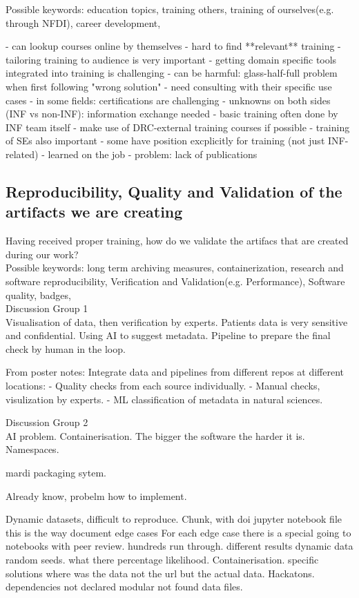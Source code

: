 \documentclass{eceasst}
\begin{document}
Possible keywords: education topics, training others, training of ourselves(e.g. through NFDI), career development,

- can lookup courses online by themselves
    - hard to find **relevant** training
    - tailoring training to audience is very important
    - getting domain specific tools integrated into training is challenging
	- can be harmful: glass-half-full problem when first following "wrong solution"
- need consulting with their specific use cases
- in some fields: certifications are challenging
    - unknowns on both sides (INF vs non-INF): information exchange needed
- basic training often done by INF team itself
- make use of DRC-external training courses if possible
- training of SEs also important
- some have position excplicitly for training (not just INF-related)
    - learned on the job
	- problem: lack of publications

\subsection{Reproducibility, Quality and Validation of the artifacts we are creating}
Having received proper training, how do we validate the artifacs that are created during our work?\\
Possible keywords: long term archiving measures, containerization, research and software reproducibility, Verification and Validation(e.g. Performance), Software quality, badges,\\

Discussion Group 1 \\
Visualisation of data, then verification by experts. Patients data is very sensitive and confidential.
Using AI to suggest metadata.
Pipeline to prepare the final check by human in the loop.

From poster notes: Integrate data and pipelines from different repos at different locations:
- Quality checks from each source individually.
- Manual checks, visulization by experts.
- ML classification of metadata in natural sciences.


Discussion Group 2\\
AI problem. Containerisation. The bigger the software the harder it is.
Namespaces.

mardi packaging sytem.

Already know, probelm how to implement.

Dynamic datasets, difficult to reproduce. Chunk, with doi jupyter notebook file this is the way document edge cases For each edge case there is a special going to notebooks with peer review. hundreds run through. different results dynamic data random seeds. what there percentage likelihood. Containerisation. specific solutions where was the data not the url but the actual data. Hackatons. dependencies not declared modular not found data files.
\end{document}
